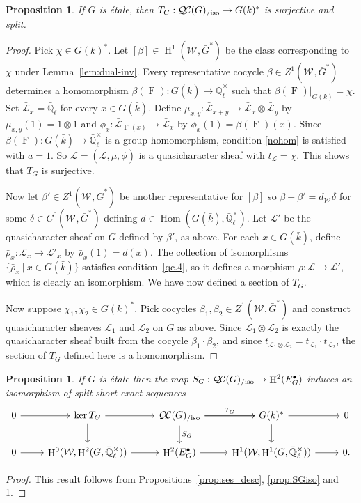 \documentclass[CM,Submssn,SecEq]{degruyter-crelle} %
\theoremstyle{plain}
\newtheorem{proposition}[theorem]{Proposition}
\theoremstyle{definition}
\theoremstyle{remark}
\newcommand{\EE}{\mathbb{\bar Q}_\ell}
\newcommand{\bFq}{\bar{k}}
\newcommand{\Fq}{k}
\newcommand{\EEx}{\EE^\times}
\newcommand{\Weil}[1]{\mathcal{W}_{#1}}
\newcommand{\Frob}[1]{\operatorname{F}_{#1}}
\DeclareMathOperator{\Hom}{Hom}
\DeclareMathOperator{\Hh}{H}
\newcommand{\tq}{{\ \vert\ }}
\newcommand{\trFrob}[1]{t_{#1}}
\newcommand{\TrFrob}[1]{T_{#1}}
\newcommand{\qcs}[1]{{\mathcal{#1}}}
\newcommand{\gqcs}[1]{{\mathcal{\bar #1}}}
\newcommand{\QC}{{\mathcal{Q\hskip-0.8pt C}}}
\newcommand{\QCiso}[1]{\QC(#1)_{/\text{iso}}}
\newcommand{\bG}{\bar{G}}
\newcommand{\brho}{{\bar\rho}}
\begin{document}
\begin{proposition}\label{prop:sur_etale}
If $G$ is \'etale, then $\TrFrob{G} : \QCiso{G} \to G(\Fq)^*$ is surjective
and split.
\end{proposition}
\begin{proof}
Pick $\chi \in G(\Fq)^*$. 
Let $[\beta]\in \Hh^1(\Weil{},\bG^*)$ be the class corresponding to $\chi$ under Lemma~\ref{lem:dual-inv}.
Every representative cocycle $\beta \in Z^1(\Weil{},\bG^*)$ determines a homomorphism $\beta(\Frob{}) : G(\bFq)\to \EEx$ such that $\beta(\Frob{})\vert_{G(\Fq)} = \chi$.
Set $\gqcs{L}_x = \EE$ for every $x\in G(\bFq)$.
Define $\mu_{x,y} : \gqcs{L}_{x+y} \to \gqcs{L}_x\otimes \gqcs{L}_y$ by $\mu_{x,y}(1) = 1 \otimes 1$ and
$\phi_{x} : \gqcs{L}_{\Frob{}(x)} \to \gqcs{L}_x$ by $\phi_{x}(1) = \beta(\Frob{})(x)$.
Since $\beta(\Frob{}) : G(\bFq) \to \EEx$ is a group homomorphism,
condition \eqref{nohom} is satisfied with $a =1$.
So $\qcs{L} = (\gqcs{L}, \mu, \phi)$
is a quasicharacter sheaf with $\trFrob{\qcs{L}} = \chi$.
This shows that $\TrFrob{G}$ is surjective.

Now let $\beta' \in Z^1(\Weil{},\bG^*)$ be another representative for $[\beta]$
so $\beta-\beta' = d_{\Weil{}} \delta$ for some $\delta \in C^0(\Weil{},\bG^*)$ defining $d \in \Hom(G(\bFq),\EEx)$.
Let $\qcs{L}'$ be the quasicharacter sheaf on $G$ defined by $\beta'$, as above.
For each $x\in G(\bFq)$, define $\brho_x :\qcs{L}_x\to \qcs{L}'_x$ by $\brho_x(1) = d(x)$.
The collection of isomorphisms $\{ \brho_x \tq x\in G(\bFq)\}$ satisfies condition~\ref{qc.4}, so it defines a morphism $\rho : \qcs{L}\to \qcs{L}'$, which is clearly an isomorphism. 
%
We have now defined a section of $\TrFrob{G}$. 

Now suppose $\chi_1, \chi_2 \in G(\Fq)^*$. Pick cocycles $\beta_1,\beta_2\in Z^1(\Weil{},\bG^*)$ and construct quasicharacter sheaves $\qcs{L}_1$ and $\qcs{L}_2$ on $G$ as above. Since $\qcs{L}_1\otimes \qcs{L}_2$ is exactly the quasicharacter sheaf built from the cocycle $\beta_1\cdot \beta_2$, and since $\trFrob{\qcs{L}_1\otimes \qcs{L}_2} = \trFrob{\qcs{L}_1}\cdot \trFrob{\qcs{L}_2}$, the section of $\TrFrob{G}$ defined here is a homomorphism.
\end{proof}

\begin{proposition} \label{prop:etale-iso}
 If $G$ is \'etale then the map $S_G : \QCiso{G}\to \Hh^2(E^\bullet_G)$ induces an isomorphism of split short exact sequences
\[
\begin{tikzcd}
 0 \arrow{r} & \ker \TrFrob{G} \arrow{d} \arrow{r} & \QCiso{G}\arrow{d}{S_G} \arrow{r}{\TrFrob{G}} \arrow{r} & G(\Fq)^* \arrow{d} \arrow{r} & 0\\
  0 \arrow{r} & \Hh^0(\Weil{},\Hh^2({\bar G},\EEx)) \arrow{r} & \Hh^2(E^\bullet_G) \arrow{r} & \Hh^1(\Weil{},\Hh^1({\bar G},\EEx)) \arrow{r} & 0.
 \end{tikzcd}
 \]
\end{proposition}
\begin{proof}
This result follows from Propositions~\ref{prop:ses_desc}, \ref{prop:SGiso} and \ref{prop:sur_etale}.
\end{proof}
\end{document}

